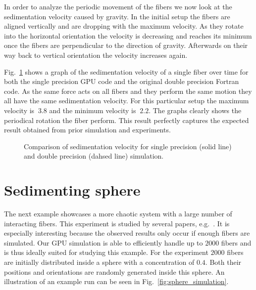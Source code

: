 In order to analyze the periodic movement of the fibers we now look at the sedimentation velocity caused by gravity. In the initial setup the fibers are aligned vertically and are dropping with the maximum velocity. As they rotate into the horizontal orientation the velocity is decreasing and reaches its minimum once the fibers are perpendicular to the direction of gravity. Afterwards on their way back to vertical orientation the velocity increases again.

Fig.~\ref{fig:ring_sedimentation_velocity} shows a graph of the sedimentation velocity of a single fiber over time for both the single precision GPU code and the original double precision Fortran code. As the same force acts on all fibers and they perform the same motion they all have the same sedimentation velocity. For this particular setup the maximum velocity is $~3.8$ and the minimum velocity is $~2.2$. The graphs clearly shows the periodical rotation the fiber perform. This result perfectly captures the expected result obtained from prior simulation and experiments.

\begin{figure}[!htbp]
  \centering
  \caption[Comparison of sedimentation velocity for single- and double-precision simulation.]{Comparison of sedimentation velocity for single precision (solid line) and double precision (dahsed line) simulation.}
  \label{fig:ring_sedimentation_velocity}
\end{figure}

\section{Sedimenting sphere}
\label{sec:example_sphere}

The next example showcases a more chaotic system with a large number of interacting fibers. This experiment is studied by several papers, e.g.~\cite{Metzger2007}\cite{Park2010}\cite{Bulow2015}. It is especially interesting because the observed results only occur if enough fibers are simulated. Our GPU simulation is able to efficiently handle up to $2000$ fibers and is thus ideally suited for studying this example. For the experiment $2000$ fibers are initially distributed inside a sphere with a concentration of $0.4$. Both their positions and orientations are randomly generated inside this sphere. An illustration of an example run can be seen in Fig.~\ref{fig:sphere_simulation}.


